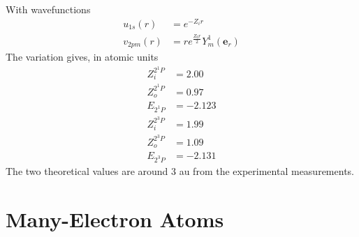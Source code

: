 \documentclass[a4paper, 11pt]{book}
\renewcommand{\vec}[1]{\mathbf{#1}}
\newcommand{\ver}[1]{\vec{e}_{#1}}
\newcommand{\1}{\opr{\mathds{1}}}
\theoremstyle{plain}
\begin{document}
	With wavefunctions
	\begin{equation}
		\begin{aligned}
			u_{1s}(r)&=e^{-Z_ir}\\
			v_{2pm}(r)&=re^{\frac{Z_0r}{2}}Y^1_m(\ver{r})
		\end{aligned}
		\label{eq:wavefunctions2pstates}
	\end{equation}
	The variation gives, in atomic units
	\begin{equation*}
		\begin{aligned}
			Z_i^{2^1P}&=2.00\\
			Z_o^{2^1P}&=0.97\\
			E_{2^1P}&=-2.123\\
			Z_i^{2^3P}&=1.99\\
			Z_o^{2^3P}&=1.09\\
			E_{2^3P}&=-2.131
		\end{aligned}
	\end{equation*}
	The two theoretical values are around $3$ au from the experimental measurements.\\
	\chapter{Many-Electron Atoms}
\end{document}
